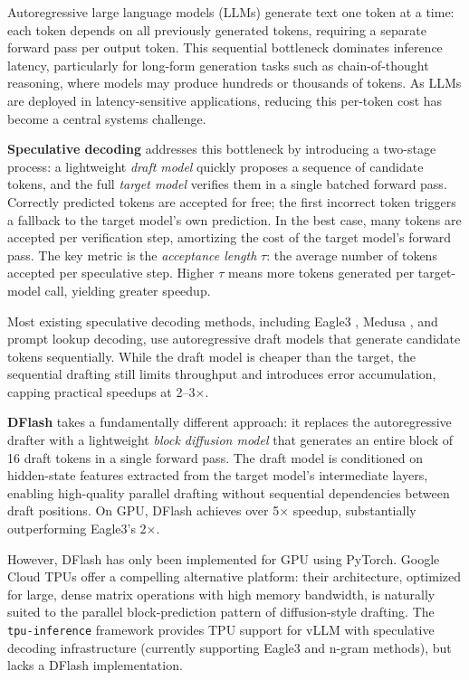 \documentclass[12pt,letterpaper]{article}
\begin{document}
Autoregressive large language models (LLMs) generate text one token at a time: each token depends on all previously generated tokens, requiring a separate forward pass per output token. This sequential bottleneck dominates inference latency, particularly for long-form generation tasks such as chain-of-thought reasoning, where models may produce hundreds or thousands of tokens. As LLMs are deployed in latency-sensitive applications, reducing this per-token cost has become a central systems challenge.

\textbf{Speculative decoding} \citep{leviathan2023fastinferencetransformersspeculative} addresses this bottleneck by introducing a two-stage process: a lightweight \emph{draft model} quickly proposes a sequence of candidate tokens, and the full \emph{target model} verifies them in a single batched forward pass. Correctly predicted tokens are accepted for free; the first incorrect token triggers a fallback to the target model's own prediction. In the best case, many tokens are accepted per verification step, amortizing the cost of the target model's forward pass. The key metric is the \emph{acceptance length} $\tau$: the average number of tokens accepted per speculative step. Higher $\tau$ means more tokens generated per target-model call, yielding greater speedup.

Most existing speculative decoding methods, including Eagle3 \citep{li2025eagle3scalinginferenceacceleration}, Medusa \citep{cai2024medusasimplellminference}, and prompt lookup decoding, use autoregressive draft models that generate candidate tokens sequentially. While the draft model is cheaper than the target, the sequential drafting still limits throughput and introduces error accumulation, capping practical speedups at 2--3$\times$.

\textbf{DFlash} \citep{chen2026dflashblockdiffusionflash} takes a fundamentally different approach: it replaces the autoregressive drafter with a lightweight \emph{block diffusion model} that generates an entire block of 16 draft tokens in a single forward pass. The draft model is conditioned on hidden-state features extracted from the target model's intermediate layers, enabling high-quality parallel drafting without sequential dependencies between draft positions. On GPU, DFlash achieves over 5$\times$ speedup, substantially outperforming Eagle3's 2$\times$.

However, DFlash has only been implemented for GPU using PyTorch. Google Cloud TPUs offer a compelling alternative platform: their architecture, optimized for large, dense matrix operations with high memory bandwidth, is naturally suited to the parallel block-prediction pattern of diffusion-style drafting. The \texttt{tpu-inference} framework \citep{tpuinference} provides TPU support for vLLM with speculative decoding infrastructure (currently supporting Eagle3 and n-gram methods), but lacks a DFlash implementation.
\end{document}
